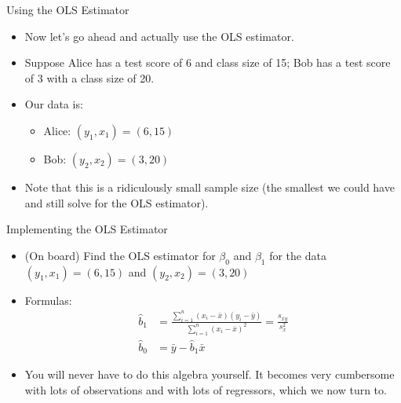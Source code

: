 \documentclass[aspectratio=169,11pt]{beamer}
\begin{document}
\begin{frame}{Using the OLS Estimator}
\begin{itemize}
\item Now let's go ahead and actually use the OLS estimator.
\medskip
\item Suppose Alice has a test score of 6 and class size of 15; Bob has a test score of 3 with a class size of 20. 
\medskip
\item Our data is:
\begin{itemize}
\item Alice: $(y_1,x_1)=(6,15)$
\item Bob: $(y_2,x_2)=(3,20)$
\end{itemize}

\item Note that this is  a ridiculously small sample size (the smallest we could have and still solve for the OLS estimator). 
\end{itemize}
\end{frame}

\begin{frame}{Implementing the OLS Estimator}
\begin{itemize}
\item (On board) Find the OLS estimator for $\beta_0$ and $\beta_1$ for the data $(y_1,x_1)=(6,15)$ and $(y_2,x_2)=(3,20)$
\medskip

\item Formulas:
\begin{align*}
\hat{b}_1 &=\frac{\sum\limits_{i=1}^n(x_i-\bar{x})(y_i-\bar{y})}{\sum\limits_{i=1}^n(x_i-\bar{x})^2}=\frac{s_{xy}}{s_{x}^{2}} \\
\hat{b}_0 & = \bar{y} - \hat{b}_1 \bar{x}
\end{align*}

\item You will never have to do this algebra yourself. It becomes very cumbersome with lots of observations and with lots of regressors,
which we now turn to.

\end{itemize}
\end{frame}
\end{document}
